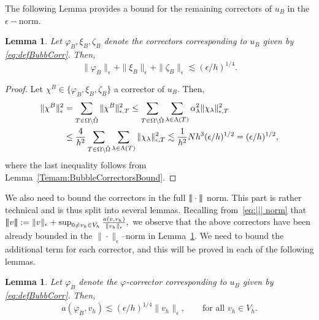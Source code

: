 \documentclass{article}
\newcommand{\vvvert}{\ensuremath|\!|\!|\xspace}
\newtheorem{lemma}[thm]{Lemma}
\begin{document}
The following Lemma provides a bound for the remaining correctors of $u_B$ in the $\epsilon-$norm.

\begin{lemma}
\label{Lemma:boundBubbleCorr}
Let $\varphi_B, \xi_B, \zeta_B$ denote the correctors corresponding to $u_B$ given by \eqref{eq:defBubbCorr}.
Then,
$$
\|\varphi_B\|_\epsilon  +  \|\xi_B\|_\epsilon + \|\zeta_B\|_\epsilon  \lesssim  (\epsilon/h)^{1/4}.
$$
\end{lemma}

\begin{proof}
Let $\chi^B\in\{\varphi_B, \xi_B,\zeta_B \}$ a corrector of $u_B$. Then,
\begin{equation*}
\begin{aligned}
    \|\chi^B\|_\epsilon^2 &= \sum_{T\in\Omega \setminus \mathaccent 23 \Omega} \|\chi^B\|_{\epsilon,T}^2 
    \le
    \sum_{T\in\Omega \setminus \mathaccent 23 \Omega}\sum_{\lambda \in \Lambda(T)}\alpha_\lambda^2\|\chi_\lambda\|_{\epsilon,T}^2
    \\
    &\le \frac{4}{h^2}\sum_{T\in\Omega \setminus \mathaccent 23 \Omega}\sum_{\lambda \in \Lambda(T)}\|\chi_\lambda\|_{\epsilon,T}^2 
    \lesssim \frac{1}{h^2} N  h^3 (\epsilon/h)^{1/2}
    =(\epsilon/h)^{1/2}
    ,
\end{aligned}
\end{equation*}
where the last inequality follows from Lemma~\ref{Temam:BubbleCorrectorsBound}.
\end{proof}

We also need to bound the correctors in the full $\vvvert \cdot\vvvert $ norm. 
This part is rather technical and is thus split into several lemmas.
Recalling from~\eqref{eq:||| norm} that $
\vvvert  v\vvvert   := \|v\|_\epsilon + 
\sup_{0\not= v_h\in V_h} \frac{a(v,v_h)}{\|v_h\|_\epsilon},
$
we observe that the above correctors have been already bounded in the $\|\cdot \|_\epsilon$--norm in Lemma~\ref{Lemma:boundBubbleCorr}. 
We need to bound the additional term for each corrector, and this will be proved in each of the following lemmas.

\begin{lemma}\label{Lemma:10}
Let $\varphi_B$ denote the $\varphi$-corrector corresponding to $u_B$ given by \eqref{eq:defBubbCorr}.
Then,
$$
 a(\varphi_B,v_h) \lesssim (\epsilon/h)^{1/4} \|v_h\|_\epsilon, \qquad \text{for all $v_h \in V_h$}.
$$
\end{lemma}
\end{document}
